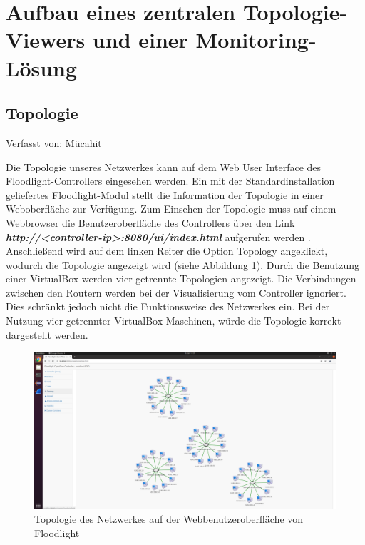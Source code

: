 \documentclass[fontsize=12pt,paper=a4,open=any,parskip=half,
  twoside=false,toc=listof,toc=bibliography,fleqn,leqno,
  captions=nooneline,captions=tableabove,british]{scrbook}
\begin{document}
\newpage
\section{Aufbau eines zentralen Topologie-Viewers und einer Monitoring-Lösung}

\subsection{Topologie}
{\tiny Verfasst von: Mücahit\par}
Die Topologie unseres Netzwerkes kann auf dem Web User Interface des Floodlight-Controllers eingesehen werden. Ein mit der Standardinstallation geliefertes Floodlight-Modul stellt die Information der Topologie in einer Weboberfläche zur Verfügung. Zum Einsehen der Topologie muss auf einem Webbrowser die Benutzeroberfläche des Controllers über den Link \textit{\textbf{http://<controller-ip>:8080/ui/index.html}} aufgerufen werden \cite{restapi}. Anschließend wird auf dem linken Reiter die Option Topology angeklickt, wodurch die Topologie angezeigt wird (siehe Abbildung \ref{topo}). Durch die Benutzung einer VirtualBox werden vier getrennte Topologien angezeigt. Die Verbindungen zwischen den Routern werden bei der Visualisierung vom Controller ignoriert. Dies schränkt jedoch nicht die Funktionsweise des Netzwerkes ein. Bei der Nutzung vier getrennter VirtualBox-Maschinen, würde die Topologie korrekt dargestellt werden.

\begin{figure}[H]
 \centering
 \includegraphics[width=1.0\textwidth]{Bilder/topo}
 \captionsetup{justification=centering}
 \caption{Topologie des Netzwerkes auf der Webbenutzeroberfläche von Floodlight}
 \label{topo}
\end{figure}

\newpage
\end{document}
